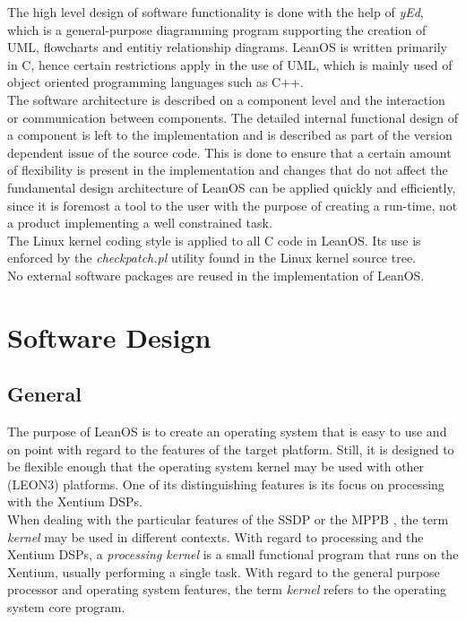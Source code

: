 The high level design of software functionality is done with the help of
\emph{yEd}, which is a general-purpose diagramming program supporting the
creation of UML, flowcharts and entitiy relationship diagrams.
LeanOS is written primarily in C, hence certain restrictions apply in the use of
UML, which is mainly used of object oriented programming languages such as C++.
\\

The software architecture is described on a component level and the interaction
or communication between components. The detailed internal functional design of
a component is left to the implementation and is described as part of the
version dependent issue of the source code. This is done to ensure that a
certain amount of flexibility is present in the implementation and changes that
do not affect the fundamental design architecture of LeanOS can be applied
quickly and efficiently, since it is foremost a tool to the user with the
purpose of creating a run-time, not a product implementing a well constrained
task.\\

The Linux kernel coding style is applied to all C code in LeanOS. Its use is
enforced by the \emph{checkpatch.pl} utility found in the Linux kernel source
tree.\\

No external software packages are reused in the implementation of LeanOS.


\chapter{Software Design}


\section{General}


The purpose of LeanOS is to create an operating system that is easy to use and on
point with regard to the features of the target platform. Still, it is designed
to be flexible enough that the operating system kernel may be used with other
(\gls{LEON3}) platforms. One of its distinguishing features is its focus on
processing with the \gls{Xentium} \glspl{DSP}.\\

\noindent
When dealing with the particular features of the \gls{SSDP} or the \gls{MPPB}
\cite{MPPB}, the term \emph{kernel} may be used in different contexts.
With regard to processing and the \gls{Xentium} \glspl{DSP}, a
\emph{processing kernel} is a small functional program that runs on the
\gls{Xentium}, usually performing a single task. With regard to the general
purpose processor and operating system features, the term \emph{kernel} refers
to the operating system core program. \\

